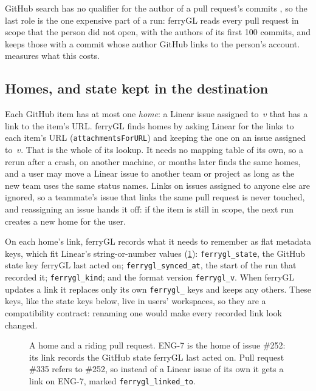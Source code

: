 \documentclass[11pt,a4paper]{article}
\newcommand{\ferry}{ferryGL}
\newcommand{\code}[1]{\texttt{#1}}
\newcommand{\key}[1]{\texttt{#1}}
\begin{document}
GitHub search has no qualifier for the author of a pull request's commits
\cite{github2026searching}, so the last role is the one expensive part of a run: \ferry{} reads
every pull request in scope that the person did not open, with the authors of its first 100
commits, and keeps those with a commit whose author GitHub links to the person's account.
 measures what this costs.

\subsection{Homes, and state kept in the destination}
\label{sec:homes}

Each GitHub item has at most one \emph{home}: a Linear issue assigned to~$v$ that has a link to
the item's URL. \ferry{} finds homes by asking Linear for the links to each item's URL
(\code{attachmentsForURL}) and keeping the one on an issue assigned to~$v$. That is the whole of
its lookup. It needs no mapping table of its own, so a rerun after a crash, on another machine,
or months later finds the same homes, and a user may move a Linear issue to another team or
project as long as the new team uses the same status names. Links on issues assigned to anyone
else are ignored, so a teammate's issue that links the same pull request is never touched, and
reassigning an issue hands it off: if the item is still in scope, the next run creates a new
home for the user.

On each home's link, \ferry{} records what it needs to remember as flat metadata keys, which fit
Linear's string-or-number values (\cref{fig:home}): \key{ferrygl\_state}, the GitHub state key
\ferry{} last acted on; \key{ferrygl\_synced\_at}, the start of the run that recorded it;
\key{ferrygl\_kind}; and the format version \key{ferrygl\_v}. When \ferry{} updates a link it
replaces only its own \key{ferrygl\_} keys and keeps any others. These keys, like the state
keys below, live in users' workspaces, so they are a compatibility contract: renaming one would
make every recorded link look changed.

\begin{figure}[t]
  \centering
  
  \caption{A home and a riding pull request. ENG-7 is the home of issue \#252: its link
    records the GitHub state \ferry{} last acted on. Pull request \#335 refers to \#252, so
    instead of a Linear issue of its own it gets a link on ENG-7, marked
    \key{ferrygl\_linked\_to}.}
  \label{fig:home}
\end{figure}
\end{document}
